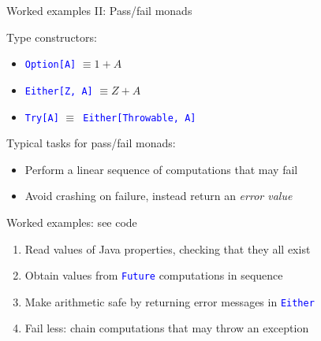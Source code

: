\documentclass[english]{beamer}
\begin{document}
\begin{frame}{Worked examples II: Pass/fail monads}

Type constructors:
\begin{itemize}
\item \texttt{\textcolor{blue}{\footnotesize{}Option{[}A{]}}} $\equiv1+A$
\item \texttt{\textcolor{blue}{\footnotesize{}Either{[}Z, A{]}}} $\equiv Z+A$
\item \texttt{\textcolor{blue}{\footnotesize{}Try{[}A{]}}} $\equiv$\texttt{\textcolor{blue}{\footnotesize{}
Either{[}Throwable, A{]}}} 
\end{itemize}
Typical tasks for pass/fail monads:
\begin{itemize}
\item Perform a linear sequence of computations that may fail
\item Avoid crashing on failure, instead return an \emph{error value}
\end{itemize}
Worked examples: see code
\begin{enumerate}
\item Read values of Java properties, checking that they all exist
\item Obtain values from \texttt{\textcolor{blue}{\footnotesize{}Future}}
computations in sequence
\item Make arithmetic safe by returning error messages in \texttt{\textcolor{blue}{\footnotesize{}Either}} 
\item Fail less: chain computations that may throw an exception
\end{enumerate}
\end{frame}
\end{document}
